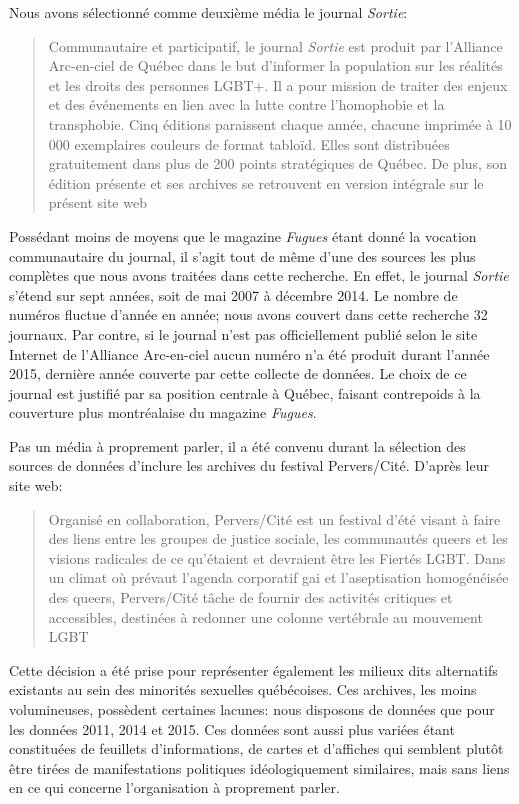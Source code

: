 Nous avons sélectionné comme deuxième média le journal \emph{Sortie}:
\blockquote[{\cite{AllianceArc2014}}][.]{Communautaire et participatif, le journal \emph{Sortie} est produit par l’Alliance Arc-en-ciel de Québec dans le but d’informer la population sur les réalités et les droits des personnes LGBT+.
 Il a pour mission de traiter des enjeux et des événements en lien avec la lutte contre l’homophobie et la transphobie.
 Cinq éditions paraissent chaque année, chacune imprimée à 10 000 exemplaires couleurs de format tabloïd.
 Elles sont distribuées gratuitement dans plus de 200 points stratégiques de Québec.
De plus, son édition présente et ses archives se retrouvent en version intégrale sur le présent site web}
Possédant moins de moyens que le magazine \emph{Fugues} étant donné la vocation communautaire du journal, il s'agit tout de même d'une des sources les plus complètes que nous avons traitées dans cette recherche.
En effet, le journal \emph{Sortie} s'étend sur sept années, soit de mai 2007 à décembre 2014.
Le nombre de numéros fluctue d'année en année; nous avons couvert dans cette recherche 32 journaux.
Par contre, si le journal n'est pas officiellement publié selon le site Internet de l'Alliance Arc-en-ciel aucun numéro n'a été produit durant l'année 2015, dernière année couverte par cette collecte de données.
Le choix de ce journal est justifié par sa position centrale à Québec, faisant contrepoids à la couverture plus montréalaise du magazine \emph{Fugues}.

Pas un média à proprement parler, il a été convenu durant la sélection des sources de données d'inclure les archives du festival Pervers/Cité.
D'après leur site web:
\blockquote[{\cite{Pervers/Cite2015}}][.]{Organisé en collaboration, Pervers/Cité est un festival d’été visant à faire des liens entre les groupes de justice sociale, les communautés queers et les visions radicales de ce qu'étaient et devraient être les Fiertés LGBT\@.
Dans un climat où prévaut l’agenda corporatif gai et l’aseptisation homogénéisée des queers, Pervers/Cité tâche de fournir des activités critiques et accessibles, destinées à redonner une colonne vertébrale au mouvement LGBT}.

Cette décision a été prise pour représenter également les milieux dits alternatifs existants au sein des minorités sexuelles québécoises.
Ces archives, les moins volumineuses, possèdent certaines lacunes: nous disposons de données que pour les données 2011, 2014 et 2015.
Ces données sont aussi plus variées étant constituées de feuillets d'informations, de cartes et d'affiches qui semblent plutôt être tirées de manifestations politiques idéologiquement similaires, mais sans liens en ce qui concerne l'organisation à proprement parler.

